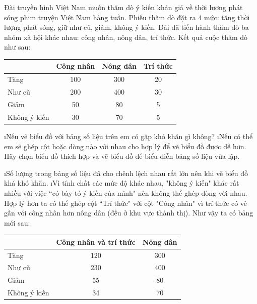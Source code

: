\begin{bt}
	Đài truyền hình Việt Nam muốn thăm dò ý kiến khán giả về thời lượng phát sóng phim truyện Việt Nam hàng tuần. Phiếu thăm dò đặt ra 4 mức: tăng thời lượng phát sóng, giữ như cũ, giảm, không ý kiến. Đài đã tiến hành thăm dò ba nhóm xã hội khác nhau: công nhân, nông dân, trí thức. Kết quả cuộc thăm dò như sau:
	\begin{center}
		\begin{tabular}{|l|c|c|c|}
			\hline
			&Công nhân&	Nông dân&	Trí thức\\
			\hline
			Tăng&	100&	300&	20\\
			\hline
			Như cũ&	200&	400&	30\\
			\hline
			Giảm&	50&	80&	5\\
			\hline
			Không ý kiến&	30	&70&	5\\
			\hline
		\end{tabular}
	\end{center}
	\begin{enumerate}[a),leftmargin=*]
		\i Nếu vẽ biểu đồ với bảng số liệu trên em có gặp khó khăn gì không?
		\i Nếu có thể em sẽ ghép cột hoặc dòng nào với nhau cho hợp lý để vẽ biểu đồ được dễ hơn. Hãy chọn biểu đồ thích hợp và vẽ biểu đồ để biểu diễn bảng số liệu vừa lập.
	\end{enumerate}
	\begin{loigiaichuong40}
		\begin{enumerate}[a),leftmargin=*]
			\i Số lượng trong bảng số liệu đã cho chênh lệch nhau rất lớn nên khi vẽ biểu đồ khá khó khăn.
			\i Vì tính chất các mức độ khác nhau, "không ý kiến" khác rất nhiều với việc  ``có bày tỏ ý kiến của mình" nên không thể ghép dòng với nhau. Hợp lý hơn ta có thể ghép cột  ``Trí thức" với cột "Công nhân" vì trí thức có vẻ gần với công nhân hơn nông dân (đều ở khu vực thành thị). Như vậy ta có bảng mới sau:
			\begin{center}
				\begin{tabular}{|l|c|c|}
					\hline
					&Công nhân và trí thức&	Nông dân\\
					\hline
					Tăng&	120&	300\\
					\hline
					Như cũ&	230&	400\\
					\hline
					Giảm&	55&	80\\
					\hline
					Không ý kiến&	34&	70\\
					\hline
				\end{tabular}
			\end{center}
		\end{enumerate}

\end{loigiaichuong40}
\end{bt}
